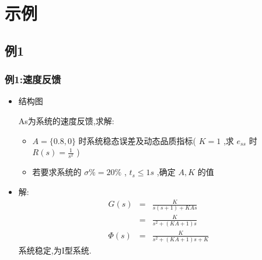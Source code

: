 \documentclass{article}
\begin{document}
\section{示例}
\label{sec-4}
\subsection{例1}
\label{sec-4-1}
\begin{frame}
\frametitle{例1:速度反馈}
\label{sec-4-1-1}
\begin{itemize}

\item 结构图
\label{sec-4-1-1-1}%

As为系统的速度反馈,求解:
\begin{itemize}
\item $A=\{0.8,0\}$ 时系统稳态误差及动态品质指标( $K=1$ ,求 $e_{ss}$ 时 $R(s)=\frac{1}{s^2}$ )
\item 若要求系统的 $\sigma\%=20\%$ , $t_s\leq 1s$ ,确定 $A,K$ 的值
\end{itemize}


\item 解:\\
\label{sec-4-1-1-2}%
\begin{eqnarray*}
G(s)&=& \frac{K}{s(s+1)+KAs}\\
    &=&  \frac{K}{s^2+(KA+1)s} \\
\Phi(s) &=& \frac{K}{s^2+(KA+1)s+K} 
\end{eqnarray*}
系统稳定,为I型系统.

\end{itemize} %
\end{frame}
\end{document}

